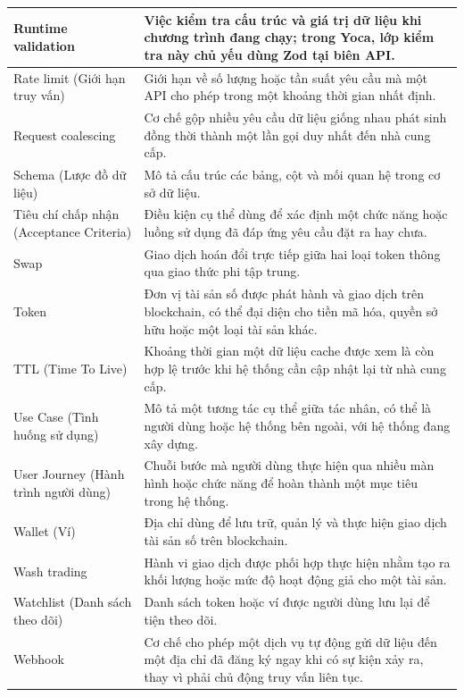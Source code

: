 \begin{longtable}{|L{3.8cm}|L{11.2cm}|}
Runtime validation & Việc kiểm tra cấu trúc và giá trị dữ liệu khi chương trình đang chạy; trong Yoca, lớp kiểm tra này chủ yếu dùng Zod tại biên API. \\
\hline

Rate limit (Giới hạn truy vấn) & Giới hạn về số lượng hoặc tần suất yêu cầu mà một API cho phép trong một khoảng thời gian nhất định. \\
\hline

Request coalescing & Cơ chế gộp nhiều yêu cầu dữ liệu giống nhau phát sinh đồng thời thành một lần gọi duy nhất đến nhà cung cấp. \\
\hline

Schema (Lược đồ dữ liệu) & Mô tả cấu trúc các bảng, cột và mối quan hệ trong cơ sở dữ liệu. \\
\hline

Tiêu chí chấp nhận (Acceptance Criteria) & Điều kiện cụ thể dùng để xác định một chức năng hoặc luồng sử dụng đã đáp ứng yêu cầu đặt ra hay chưa. \\
\hline

Swap & Giao dịch hoán đổi trực tiếp giữa hai loại token thông qua giao thức phi tập trung. \\
\hline

Token & Đơn vị tài sản số được phát hành và giao dịch trên blockchain, có thể đại diện cho tiền mã hóa, quyền sở hữu hoặc một loại tài sản khác. \\
\hline

TTL (Time To Live) & Khoảng thời gian một dữ liệu cache được xem là còn hợp lệ trước khi hệ thống cần cập nhật lại từ nhà cung cấp. \\
\hline

Use Case (Tình huống sử dụng) & Mô tả một tương tác cụ thể giữa tác nhân, có thể là người dùng hoặc hệ thống bên ngoài, với hệ thống đang xây dựng. \\
\hline

User Journey (Hành trình người dùng) & Chuỗi bước mà người dùng thực hiện qua nhiều màn hình hoặc chức năng để hoàn thành một mục tiêu trong hệ thống. \\
\hline

Wallet (Ví) & Địa chỉ dùng để lưu trữ, quản lý và thực hiện giao dịch tài sản số trên blockchain. \\
\hline

Wash trading & Hành vi giao dịch được phối hợp thực hiện nhằm tạo ra khối lượng hoặc mức độ hoạt động giả cho một tài sản. \\
\hline

Watchlist (Danh sách theo dõi) & Danh sách token hoặc ví được người dùng lưu lại để tiện theo dõi. \\
\hline

Webhook & Cơ chế cho phép một dịch vụ tự động gửi dữ liệu đến một địa chỉ đã đăng ký ngay khi có sự kiện xảy ra, thay vì phải chủ động truy vấn liên tục. \\
\hline

\end{longtable}
\normalsize
